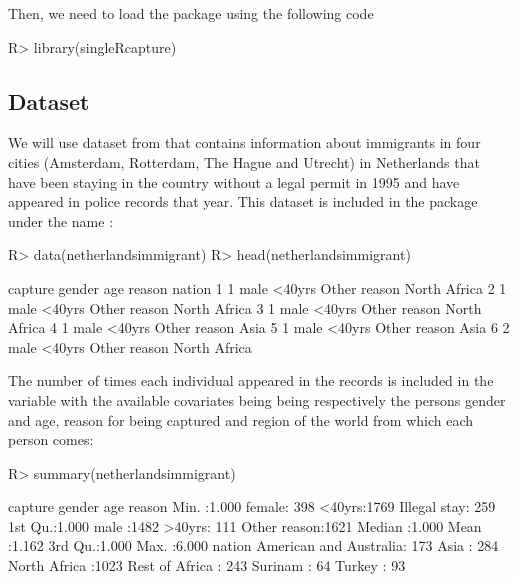 \documentclass[
]{jss}
\newcommand{\1}{\mathcal{I}} \newcommand{\bZero}{\boldsymbol{0}}
\begin{document}
Then, we need to load the package using the following code

\begin{CodeChunk}
\begin{CodeInput}
R> library(singleRcapture)
\end{CodeInput}
\end{CodeChunk}

\subsection{Dataset}\label{dataset}

We will use dataset from \cite{ztpoisson} that contains information
about immigrants in four cities (Amsterdam, Rotterdam, The Hague and
Utrecht) in Netherlands that have been staying in the country without a
legal permit in 1995 and have appeared in police records that year. This
dataset is included in the package under the name
:

\begin{CodeChunk}
\begin{CodeInput}
R> data(netherlandsimmigrant)
R> head(netherlandsimmigrant)
\end{CodeInput}
\begin{CodeOutput}
  capture gender    age       reason       nation
1       1   male <40yrs Other reason North Africa
2       1   male <40yrs Other reason North Africa
3       1   male <40yrs Other reason North Africa
4       1   male <40yrs Other reason         Asia
5       1   male <40yrs Other reason         Asia
6       2   male <40yrs Other reason North Africa
\end{CodeOutput}
\end{CodeChunk}

The number of times each individual appeared in the records is included
in the  variable with the available covariates being
 being respectively the persons gender
and age, reason for being captured and region of the world from which
each person comes:

\begin{CodeChunk}
\begin{CodeInput}
R> summary(netherlandsimmigrant)
\end{CodeInput}
\begin{CodeOutput}
    capture         gender         age                reason    
 Min.   :1.000   female: 398   <40yrs:1769   Illegal stay: 259  
 1st Qu.:1.000   male  :1482   >40yrs: 111   Other reason:1621  
 Median :1.000                                                  
 Mean   :1.162                                                  
 3rd Qu.:1.000                                                  
 Max.   :6.000                                                  
                    nation    
 American and Australia: 173  
 Asia                  : 284  
 North Africa          :1023  
 Rest of Africa        : 243  
 Surinam               :  64  
 Turkey                :  93  
\end{CodeOutput}
\end{CodeChunk}
\end{document}
